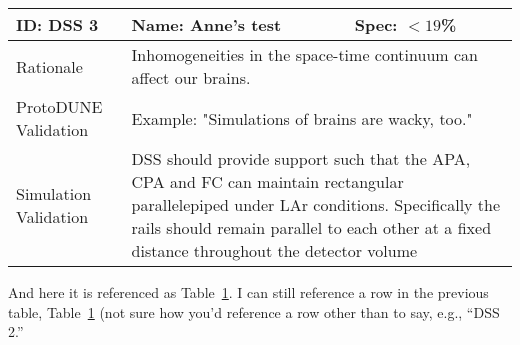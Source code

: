 \documentclass{article}
\begin{document}
\begin{table}[htp]
\begin{tabular}{ |l|p{}|p{}| }
    \rowcolor{dunetablecolor}
ID:  DSS 3   & Name: Anne's test  & Spec:  $<19$\%  \\
    \hline
    Rationale &  \multicolumn{2}{p{0.7\textwidth}|}{ Inhomogeneities in the space-time continuum can affect our brains. } \\
    \hline
ProtoDUNE Validation & \multicolumn{2}{p{0.7\textwidth}|}{ Example: "Simulations of brains are wacky, too." } \\
    \hline
Simulation Validation & \multicolumn{2}{p{0.7\textwidth}|}{ DSS should provide support such that the APA, CPA and FC can maintain rectangular parallelepiped under LAr conditions. Specifically the rails should remain parallel to each other at a fixed distance throughout the detector volume } \\
        \hline
   

 
  \end{tabular}
  \label{tab:spectable:DSS}
\end{table}


And here it is referenced as Table~\ref{tab:spectable:DSS}.  
I can still reference a row in the previous table,
Table~\ref{tab:spectable:DSS} (not sure how you'd reference a row other than to say, e.g., ``DSS 2.''
\end{document}

